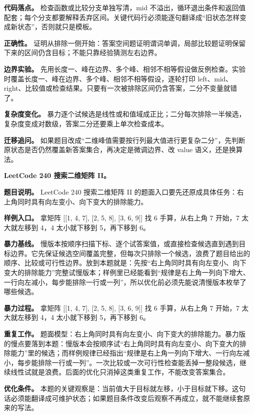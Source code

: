 \textbf{代码落点。} 检查函数或比较分支单独写清，mid 不溢出，循环退出条件和返回值配套；每个分支都要解释丢弃区间。关键代码行必须能逐句翻译成“旧状态怎样变成新状态”，否则就只是模板。

\textbf{正确性。} 证明从排除一侧开始：答案空间题证明谓词单调，局部比较题证明保留下来的区间仍含目标；不能只靠经验猜测左右边界。

\textbf{边界实验。} 先用长度一、峰在边界、多个峰、相邻不相等假设做反例检查。实验时覆盖长度一、峰在边界、多个峰、相邻不相等假设，逐轮打印 left、mid、right、比较值或检查结果。只要有一次被排除区间仍含答案，二分不变量就错了。

\textbf{复杂度变化。} 暴力逐个试候选是线性或和值域成正比；二分每次排除一半候选，复杂度变成对数级，答案二分还要乘上单次检查成本。

\textbf{迁移追问。} 如果题目改成“二维峰值需要按行列最大值进行更复杂二分”，先判断原状态是否仍然覆盖新答案集合，再决定是微调边界、改 value 语义，还是换算法。

\noindent\textbf{LeetCode 240 搜索二维矩阵 II。}

\textbf{题目说明。} LeetCode 240 搜索二维矩阵 II 的题面入口要先还原成具体任务：右上角同时具有向左变小、向下变大的排除能力。

\textbf{样例入口。} 拿矩阵 [[1, 4, 7], [2, 5, 8], [3, 6, 9]] 找 6 手算，从右上角 7 开始，7 太大就左移到 4，4 太小就下移到 5，再下移到 6。

\textbf{暴力基线。} 慢版本按顺序扫描下标、逐个试答案值，或直接检查候选直到遇到目标边界。它先保证候选空间覆盖完整，但每次只排除一个候选，浪费了题目给出的顺序、比较或可行性边界。放到本题就是：先按“右上角同时具有向左变小、向下变大的排除能力”完整试慢版本；样例里已经能看到“规律是右上角一列向下增大、一行向左减小，每步能排除一行或一列”，所以优化前必须先能说清慢版本枚举了哪些候选。

\textbf{暴力过程。} 拿矩阵 [[1, 4, 7], [2, 5, 8], [3, 6, 9]] 找 6 手算，从右上角 7 开始，7 太大就左移到 4，4 太小就下移到 5，再下移到 6。

\textbf{重复工作。} 题面模型：右上角同时具有向左变小、向下变大的排除能力。暴力版的慢点要落到本题：慢版本会按顺序试“右上角同时具有向左变小、向下变大的排除能力”里的候选；而样例规律已经指出“规律是右上角一列向下增大、一行向左减小，每步能排除一行或一列”。一次比较或一次可行性检查能丢掉一整段候选，继续线性试就是浪费。后面的优化只消掉这类重复工作，不能改变答案集合。

\textbf{优化条件。} 本题的关键观察是：当前值大于目标就左移，小于目标就下移。这句话必须能翻译成可维护状态；如果题目条件改变后观察不再成立，就不能继续套原来的写法。

